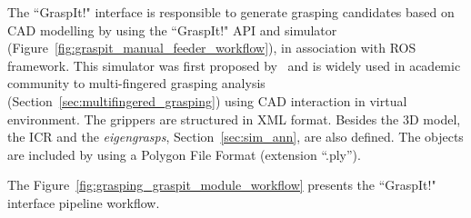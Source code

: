 The ``GraspIt!" interface is responsible to generate grasping candidates based on CAD modelling by using the ``GraspIt!" API and simulator (Figure~\ref{fig:graspit_manual_feeder_workflow}), in association with \ac{ROS} framework. This simulator was first proposed by~\cite{miller2004graspit} and is widely used in academic community to multi-fingered grasping analysis (Section~\ref{sec:multifingered_grasping}) using CAD interaction in virtual environment. The grippers are structured in XML format. Besides the 3D model, the \ac{ICR} and the \textit{eigengrasps}, Section~\ref{sec:sim_ann}, are also defined. The objects are included by using a Polygon File Format (extension ``.ply'').

\begin{figure}[h!]
\end{figure}

The Figure~\ref{fig:grasping_graspit_module_workflow} presents the ``GraspIt!" interface pipeline workflow.

